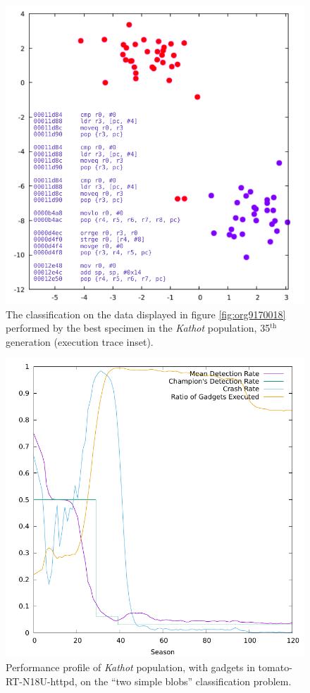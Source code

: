 \documentclass[12pt,glossary]{dalthesis}
\begin{document}
\begin{figure}[htbp]
\centering
\includegraphics[width=.9\linewidth]{../images/plots/kathot_champion_18916_blobs_disas.pdf}
\caption{\label{fig:org3ba7052}
The classification on the data displayed in figure \ref{fig:org9170018} performed by the best specimen in the \emph{Kathot} population, 35\(^{\text{th}}\) generation (execution trace inset).}
\end{figure}

\begin{figure}[htbp]
\centering
\includegraphics[width=.9\linewidth]{../images/plots/kathot_fitness.pdf}
\caption{\label{fig:orge182afd}
Performance profile of \emph{Kathot} population, with gadgets in tomato-RT-N18U-httpd, on the ``two simple blobs'' classification problem.}
\end{figure}
\end{document}

